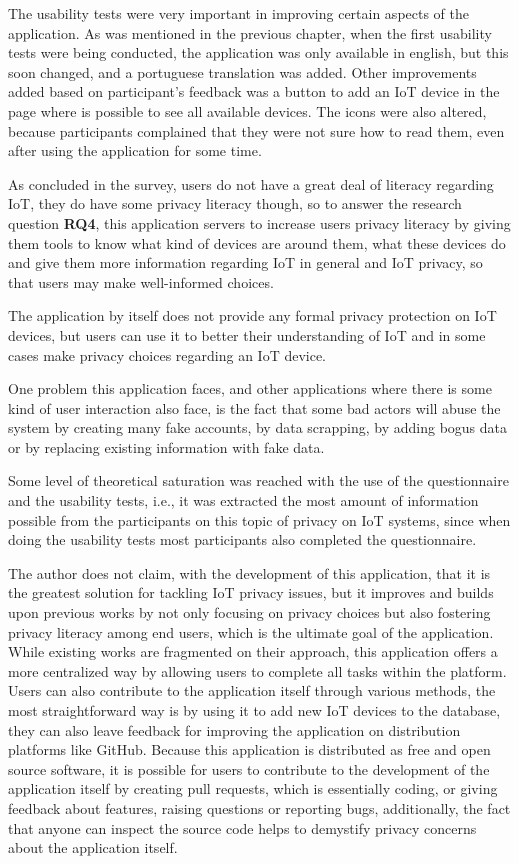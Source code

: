 The usability tests were very important in improving certain aspects of the
application. As was mentioned in the previous chapter, when the first
usability tests were being conducted, the application was only available
in english, but this soon changed, and a portuguese translation was added.
Other improvements added based on participant's feedback was a button
to add an IoT device in the page where is possible to see all available
devices. The icons were also altered, because participants complained that
they were not sure how to read them, even after using the application for some time.

As concluded in the survey, users do not have a great deal of literacy
regarding IoT, they do have some privacy literacy though, so
to answer the research question \textbf{RQ4}, this application servers to increase users
privacy literacy by giving them tools to know what kind of devices
are around them, what these devices do and give them more information
regarding IoT in general and IoT privacy, so that users may make
well-informed choices.

The application by itself does not provide any formal privacy protection
on IoT devices, but users can use it to better their understanding of IoT
and in some cases make privacy choices regarding an IoT device.

One problem this application faces, and other applications where there is
some kind of user interaction also face, is the fact that some bad
actors will abuse the system by creating many fake accounts, by
data scrapping, by adding bogus data or by replacing existing information
with fake data.

Some level of theoretical saturation \cite{low2019pragmatic} was reached with the use of the questionnaire
and the usability tests, i.e., it was extracted the most amount of information
possible from the participants on this topic of privacy on IoT systems, since
when doing the usability tests most participants also completed the questionnaire.

The author does not claim, with the development of this application, that
it is the greatest solution for tackling IoT privacy issues, but it improves
and builds upon previous works by not only focusing on privacy choices but also
fostering privacy literacy among end users, which is the ultimate goal
of the application. While existing works are fragmented on their approach,
this application offers a more centralized way by allowing users to complete
all tasks within the platform. Users can also contribute to the application itself
through various methods, the most straightforward way is by using it to
add new IoT devices to the database, they can also leave
feedback for improving the application on distribution platforms like GitHub.
Because this application is distributed as free and open source software, it
is possible for users to contribute to the development of the
application itself by creating pull requests, which is essentially coding,
or giving feedback about features, raising questions or reporting bugs,
additionally, the fact that anyone can inspect the source code helps
to demystify privacy concerns about the application itself.
